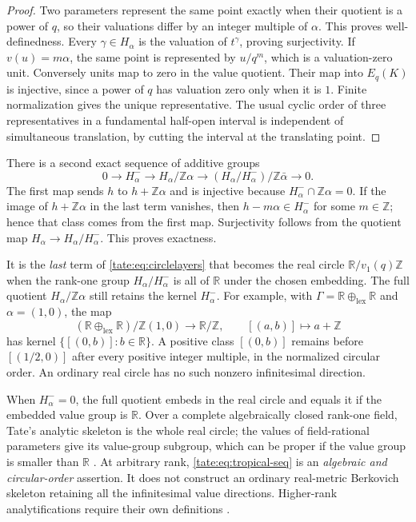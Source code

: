 \documentclass[11pt,letterpaper]{article}
\theoremstyle{definition}
\newcommand{\R}{\mathbb R}
\newcommand{\Z}{\mathbb Z}
\begin{document}
\begin{proof}
Two parameters represent the same point exactly when their quotient is
a power of $q$, so their valuations differ by an integer multiple of
$\alpha$. This proves well-definedness. Every $\gamma\in H_\alpha$
is the valuation of $t^\gamma$, proving surjectivity.
If $v(u)=m\alpha$, the same point is represented by $u/q^m$, which is
a valuation-zero unit. Conversely units map to zero in the value
quotient. Their map into $E_q(K)$ is injective, since a power of $q$
has valuation zero only when it is $1$. Finite normalization gives the
unique representative. The usual cyclic order of three representatives
in a fundamental half-open interval is independent of simultaneous
translation, by cutting the interval at the translating point.
\end{proof}

There is a second exact sequence of additive groups
\begin{equation}
 0\longrightarrow H_\alpha^-\longrightarrow H_\alpha/\Z\alpha
 \longrightarrow
 (H_\alpha/H_\alpha^-)/\Z\bar\alpha\longrightarrow0.
 \label{tate:eq:circlelayers}
\end{equation}
The first map sends $h$ to $h+\Z\alpha$ and is injective because
$H_\alpha^-\cap\Z\alpha=0$. If the image of $h+\Z\alpha$ in the last
term vanishes, then $h-m\alpha\in H_\alpha^-$ for some $m\in\Z$; hence
that class comes from the first map. Surjectivity follows from the
quotient map $H_\alpha\to H_\alpha/H_\alpha^-$. This proves exactness.

It is the \emph{last} term of \eqref{tate:eq:circlelayers} that becomes
the real circle $\R/v_1(q)\Z$ when the rank-one group
$H_\alpha/H_\alpha^-$ is all of $\R$ under the chosen embedding.
The full quotient $H_\alpha/\Z\alpha$ still retains the kernel
$H_\alpha^-$. For example, with
$\Gamma=\R\oplus_{\mathrm{lex}}\R$ and $\alpha=(1,0)$, the map
\[
 (\R\oplus_{\mathrm{lex}}\R)/\Z(1,0)\longrightarrow\R/\Z,\qquad
 [(a,b)]\longmapsto a+\Z
\]
has kernel $\{[(0,b)]:b\in\R\}$. A positive class $[(0,b)]$ remains
before $[(1/2,0)]$ after every positive integer multiple, in the
normalized circular order. An ordinary real circle has no such
nonzero infinitesimal direction.

When $H_\alpha^-=0$, the full quotient embeds in the real circle and
equals it if the embedded value group is $\R$. Over a complete
algebraically closed rank-one field, Tate's analytic skeleton is the
whole real circle; the values of field-rational parameters give its
value-group subgroup, which can be proper if the value group is smaller
than $\R$ \cite[Remark~4.24]{BPR}.
At arbitrary rank, \eqref{tate:eq:tropical-seq} is an \emph{algebraic and
circular-order} assertion. It does not construct an ordinary real-metric
Berkovich skeleton retaining all the infinitesimal value directions.
Higher-rank analytifications require their own definitions \cite{FR}.
\end{document}
